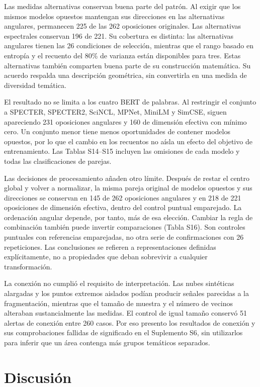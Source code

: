 \documentclass[12pt]{article}
\begin{document}
Las medidas alternativas conservan buena parte del patrón. Al exigir que los mismos modelos opuestos mantengan sus direcciones en las alternativas angulares, permanecen 225 de las 262 oposiciones originales. Las alternativas espectrales conservan 196 de 221. Su cobertura es distinta: las alternativas angulares tienen las 26 condiciones de selección, mientras que el rango basado en entropía y el recuento del 80\% de varianza están disponibles para tres. Estas alternativas también comparten buena parte de su construcción matemática. Su acuerdo respalda una descripción geométrica, sin convertirla en una medida de diversidad temática.

El resultado no se limita a los cuatro BERT de palabras. Al restringir el conjunto a SPECTER, SPECTER2, SciNCL, MPNet, MiniLM y SimCSE, siguen apareciendo 231 oposiciones angulares y 160 de dimensión efectiva con mínimo cero. Un conjunto menor tiene menos oportunidades de contener modelos opuestos, por lo que el cambio en los recuentos no aísla un efecto del objetivo de entrenamiento. Las Tablas S14--S15 incluyen las omisiones de cada modelo y todas las clasificaciones de parejas.

Las decisiones de procesamiento añaden otro límite. Después de restar el centro global y volver a normalizar, la misma pareja original de modelos opuestos y sus direcciones se conservan en 145 de 262 oposiciones angulares y en 218 de 221 oposiciones de dimensión efectiva, dentro del control puntual emparejado. La ordenación angular depende, por tanto, más de esa elección. Cambiar la regla de combinación también puede invertir comparaciones (Tabla S16). Son controles puntuales con referencias emparejadas, no otra serie de confirmaciones con 26 repeticiones. Las conclusiones se refieren a representaciones definidas explícitamente, no a propiedades que deban sobrevivir a cualquier transformación.

La conexión no cumplió el requisito de interpretación. Las nubes sintéticas alargadas y los puntos extremos aislados podían producir señales parecidas a la fragmentación, mientras que el tamaño de muestra y el número de vecinos alteraban sustancialmente las medidas. El control de igual tamaño conservó 51 alertas de conexión entre 260 casos. Por eso presento los resultados de conexión y sus comprobaciones fallidas de significado en el Suplemento S6, sin utilizarlos para inferir que un área contenga más grupos temáticos separados.

\section{Discusión}
\end{document}
